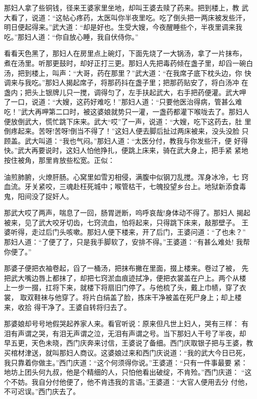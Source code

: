 那妇人拿了些铜钱，径来王婆家里坐地，却叫王婆去赎了药来。把到楼上，教
武大看了，说道：“这帖心疼药，太医叫你半夜里吃。吃了倒头把一两床被发些汗，
明日便起得来。”武大道：“却是好也。生受大嫂，今夜醒睡些个，半夜里调来我
吃。”那妇人道：“你自放心睡，我自伏侍你。”

看看天色黑了，那妇人在房里点上碗灯，下面先烧了一大锅汤，拿了一片抹布，
煮在汤里。听那更鼓时，却好正打三更。那妇人先把毒药倾在盏子里，却舀一碗白
汤，把到楼上，叫声：“大哥，药在那里？”武大道：“在我席子底下枕头边，你
快调来与我吃。”那妇人揭起席子，将那药抖在盏子里；把那药贴安了，将白汤冲
在盏内；把头上银牌儿只一搅，调得匀了，左手扶起武大，右手把药便灌。武大呷
了一口，说道：“大嫂，这药好难吃！”那妇人道：“只要他医治得病，管甚么难
吃！”武大再呷第二口时，被这婆娘就势只一灌，一盏药都灌下喉咙去了。那妇人
便放倒武大，慌忙跳下床来。武大“哎”了一声，说道：“大嫂，吃下这药去，肚
里倒疼起来。苦呀!苦呀!倒当不得了！”这妇人便去脚后扯过两床被来，没头没脸
只顾盖。武大叫道：“我也气闷。”那妇人道：“太医分付，教我与你发些汗，便
好得快。”武大再要说时，这妇人怕他挣扎，便跳上床来，骑在武大身上，把手紧
紧地按住被角，那里肯放些松宽。正似：

油煎肺腑，火燎肝肠。心窝里如雪刃相侵，满腹中似钢刀乱搅。浑身冰冷，七
窍血流。牙关紧咬，三魂赴枉死城中；喉管枯干，七魄投望乡台上。地狱新添食毒
鬼，阳间没了捉奸人。

那武大哎了两声，喘息了一回，肠胃迸断，呜呼哀哉!身体动不得了。那妇人
揭起被来，见了武大咬牙切齿，七窍流血，怕将起来，只得跳下床来，敲那壁子。
王婆听得，走过后门头咳嗽。那妇人便下楼来，开了后门，王婆问道：“了也未？”
那妇人道：“了便了了，只是我手脚软了，安排不得。”王婆道：“有甚么难处!
我帮你便了。”

那婆子便把衣袖卷起，舀了一桶汤，把抹布撇在里面，掇上楼来。卷过了被，
先把武大嘴边唇上都抹了，却把七窍淤血痕迹拭净，便把衣裳盖在户上。两个从楼
上一步一掇，扛将下来，就楼下将扇旧门停了。与他梳了头，戴上巾帻，穿了衣裳，
取双鞋袜与他穿了。将片白绢盖了脸，拣床干净被盖在死尸身上；却上楼来，收拾
得干净了。王婆自转将归去了。

那婆娘却号号地假哭起养家人来。看官听说：原来但凡世上妇人，哭有三样：
有泪有声谓之哭，有泪无声谓之泣，无泪有声谓之号。当下那妇人干号了半夜，却
早五更，天色未晓，西门庆奔来讨信，王婆说了备细。西门庆取银子把与王婆，教
买棺材津送，就叫那妇人商议。这婆娘过来和西门庆说道：“我的武大今日已死，
我只靠着你做主。”西门庆道：“这个何须得你说。”王婆道：“只有一件事最要
紧：地坊上团头何九叔，他是个精细的人，只怕他看出破绽，不肯殓。”西门庆道：
“这个不妨。我自分付他便了，他不肯违我的言语。”王婆道：“大官人便用去分
付他，不可迟误。”西门庆去了。

